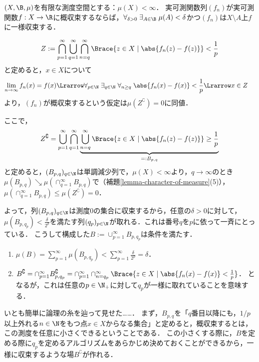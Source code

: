 \documentclass[uplatex, dvipdfmx]{jsreport}
\begin{document}
\begin{theorem}[Egorov (1911)]\label{thm-Egorov}
    $(X,\B,\mu)$を有限な測度空間とする：$\mu(X)<\infty$．
    実可測関数列$(f_n)$が実可測関数$f:X\to\R$に概収束するならば，$\forall_{\delta>0}\;\exists_{A\in\B}\;\mu(A)<\delta$かつ$(f_n)$は$X\setminus A$上$f$に一様収束する．
\end{theorem}
\begin{Proof}
    \[Z:=\bigcap^\infty_{p=1}\bigcup_{q=1}^\infty\bigcap^\infty_{n=q}\Brace{z\in X\mid \abs{f_n(z)-f(z)}}<\frac{1}{p}\]
    と定めると，$x\in X$について
    \begin{align*}
        \lim_{n\to\infty}f_n(x)=f(x)&\Lrarrow \forall_{p\in\N}\;\exists_{q\in\N}\;\forall_{n\ge q}\;\abs{f_n(x)-f(x)}<\frac{1}{p}\Lrarrow x\in Z
    \end{align*}
    より，$(f_n)$が概収束するという仮定は$\mu(Z^\complement)=0$に同値．

    ここで，
    \[Z^\complement=\bigcup^\infty_{p=1}\bigcap_{q=1}^\infty\underbrace{\bigcup^\infty_{n=q}\Brace{z\in X\mid \abs{f_n(z)-f(z)}}\ge\frac{1}{p}}_{=:B_{p,q}}\]
    と定めると，$(B_{p,q})_{q\in\N}$は単調減少列で，$\mu(X)<\infty$より，$q\to\infty$のとき$\mu(B_{p,q})\searrow \mu(\cap^\infty_{q=1}B_{p,q})$で（補題\ref{lemma-character-of-measure}(5)），
    $\mu(\cap^\infty_{q=1}B_{p,q})\le\mu(Z^\complement)=0$．

    よって，列$(B_{p,q})_{q\in\N}$は測度$0$の集合に収束するから，任意の$\delta>0$に対して，
    $\mu(B_{p,q_p})<\frac{\delta}{2^p}$を満たす列$(q_p)_{p\in\N}$が取れる．これは番号$q$を$p$に依って一斉にとっている．
    こうして構成した$B:=\cup^\infty_{p=1}B_{p,q_p}$は条件を満たす．
    \begin{enumerate}
        \item $\mu(B)=\sum^\infty_{p=1}\mu(B_{p,q_p})<\sum^\infty_{p=1}\frac{\delta}{2^p}=\delta$．
        \item $B^\complement=\cap^\infty_{p=1}B^\complement_{p,q_p}=\cap^\infty_{p=1}\cap^\infty_{n=q_p}\Brace{z\in X\mid \abs{f_n(x)-f(x)}<\frac{1}{p}}$．
        となるが，これは任意の$p\in\N_+$に対して$q_p$が一様に取れていることを意味する．
    \end{enumerate}
\end{Proof}
\begin{remarks}
    いとも簡単に論理の糸を辿って見せた……．
    まず，$B_{p,q}$を「$q$番目以降にも，$1/p$以上外れる$n\in\N$をもつ点$x\in X$からなる集合」と定めると，概収束するとは，この測度を任意に小さくできるということである．
    この小さくする際に，$B$を定める際に$q_p$を定めるアルゴリズムをあらかじめ決めておくことができるから，一様に収束するような場$B^\complement$が作れる．
\end{remarks}
\end{document}
